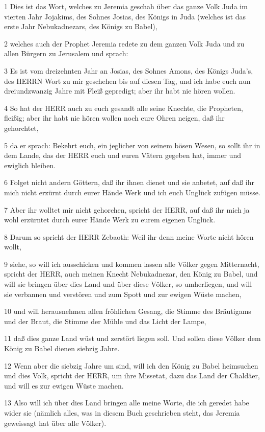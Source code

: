 \par 1 Dies ist das Wort, welches zu Jeremia geschah über das ganze Volk Juda im vierten Jahr Jojakims, des Sohnes Josias, des Königs in Juda (welches ist das erste Jahr Nebukadnezars, des Königs zu Babel),
\par 2 welches auch der Prophet Jeremia redete zu dem ganzen Volk Juda und zu allen Bürgern zu Jerusalem und sprach:
\par 3 Es ist vom dreizehnten Jahr an Josias, des Sohnes Amons, des Königs Juda's, des HERRN Wort zu mir geschehen bis auf diesen Tag, und ich habe euch nun dreiundzwanzig Jahre mit Fleiß gepredigt; aber ihr habt nie hören wollen.
\par 4 So hat der HERR auch zu euch gesandt alle seine Knechte, die Propheten, fleißig; aber ihr habt nie hören wollen noch eure Ohren neigen, daß ihr gehorchtet,
\par 5 da er sprach: Bekehrt euch, ein jeglicher von seinem bösen Wesen, so sollt ihr in dem Lande, das der HERR euch und euren Vätern gegeben hat, immer und ewiglich bleiben.
\par 6 Folget nicht andern Göttern, daß ihr ihnen dienet und sie anbetet, auf daß ihr mich nicht erzürnt durch eurer Hände Werk und ich euch Unglück zufügen müsse.
\par 7 Aber ihr wolltet mir nicht gehorchen, spricht der HERR, auf daß ihr mich ja wohl erzürntet durch eurer Hände Werk zu eurem eigenen Unglück.
\par 8 Darum so spricht der HERR Zebaoth: Weil ihr denn meine Worte nicht hören wollt,
\par 9 siehe, so will ich ausschicken und kommen lassen alle Völker gegen Mitternacht, spricht der HERR, auch meinen Knecht Nebukadnezar, den König zu Babel, und will sie bringen über dies Land und über diese Völker, so umherliegen, und will sie verbannen und verstören und zum Spott und zur ewigen Wüste machen,
\par 10 und will herausnehmen allen fröhlichen Gesang, die Stimme des Bräutigams und der Braut, die Stimme der Mühle und das Licht der Lampe,
\par 11 daß dies ganze Land wüst und zerstört liegen soll. Und sollen diese Völker dem König zu Babel dienen siebzig Jahre.
\par 12 Wenn aber die siebzig Jahre um sind, will ich den König zu Babel heimsuchen und dies Volk, spricht der HERR, um ihre Missetat, dazu das Land der Chaldäer, und will es zur ewigen Wüste machen.
\par 13 Also will ich über dies Land bringen alle meine Worte, die ich geredet habe wider sie (nämlich alles, was in diesem Buch geschrieben steht, das Jeremia geweissagt hat über alle Völker).
